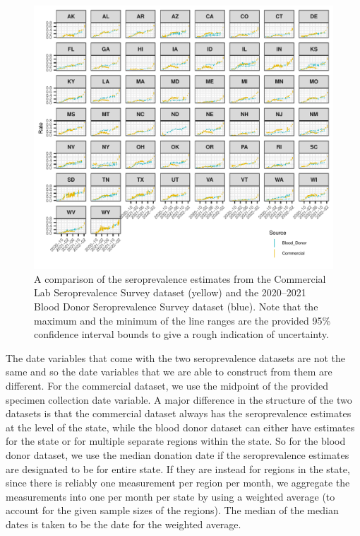 \documentclass{article}
\begin{document}
\begin{figure}[!tb]
\centering
    \includegraphics[width=.99\textwidth]{sero_blood_comm_compar.pdf}
    \caption{A comparison of the seroprevalence estimates from the Commercial
    Lab Seroprevalence Survey dataset (yellow) and the 2020--2021 Blood Donor 
    Seroprevalence Survey dataset (blue). Note that the maximum and the minimum
    of the line ranges are the provided 95\% confidence interval bounds to 
    give a rough indication of uncertainty.}
    \label{fig:sero_blood_comm_compar}
\end{figure}

The date variables that come with the two seroprevalence datasets are not the
same and so the date variables that we are able to construct from them are
different. For the commercial dataset, we use the midpoint of the provided
specimen collection date variable. A major difference in the structure of the
two datasets is that the commercial dataset always has the seroprevalence
estimates at the level of the state, while the blood donor dataset can either have 
estimates for the state or for multiple separate regions within the state. So for the 
blood donor dataset, we use the median donation date if the seroprevalence 
estimates are designated to be for entire state. If they are instead for regions in 
the state, since there is reliably one measurement per region per month, we 
aggregate the measurements into one per month per state by using a weighted 
average (to account for the given sample sizes of the regions). The median of the 
median dates is taken to be the date for the weighted average.
\end{document}
